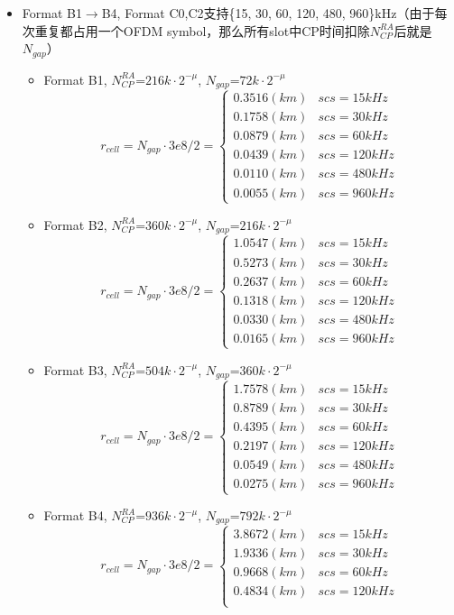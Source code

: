 \documentclass{article}
\begin{document}
\begin{itemize}
\item Format B1$\to$B4, Format C0,C2支持\{15, 30, 60, 120, 480, 960\}kHz（由于每次重复都占用一个OFDM symbol，那么所有slot中CP时间扣除$N_{CP}^{RA}$后就是$N_{gap}$）
\begin{itemize}
\item Format B1, $N_{CP}^{RA}$=$216k\cdot 2^{-\mu}$, $N_{gap}$=$72k\cdot 2^{-\mu}$
\[
r_{cell} = N_{gap}\cdot 3e8/2=\begin{cases}
0.3516(km) & scs=15kHz \\
0.1758(km) & scs=30kHz \\
0.0879(km) & scs=60kHz \\
0.0439(km) & scs=120kHz \\
0.0110(km) & scs=480kHz \\
0.0055(km) & scs=960kHz
\end{cases}
\]
\item Format B2, $N_{CP}^{RA}$=$360k\cdot 2^{-\mu}$, $N_{gap}$=$216k\cdot 2^{-\mu}$
\[
r_{cell} = N_{gap}\cdot 3e8/2=\begin{cases}
1.0547(km) & scs=15kHz \\
0.5273(km) & scs=30kHz \\
0.2637(km) & scs=60kHz \\
0.1318(km) & scs=120kHz \\
0.0330(km) & scs=480kHz \\
0.0165(km) & scs=960kHz
\end{cases}
\]
\item Format B3, $N_{CP}^{RA}$=$504k\cdot 2^{-\mu}$, $N_{gap}$=$360k\cdot 2^{-\mu}$
\[
r_{cell} = N_{gap}\cdot 3e8/2=\begin{cases}
1.7578(km) & scs=15kHz \\
0.8789(km) & scs=30kHz \\
0.4395(km) & scs=60kHz \\
0.2197(km) & scs=120kHz \\
0.0549(km) & scs=480kHz \\
0.0275(km) & scs=960kHz
\end{cases}
\]
\item Format B4, $N_{CP}^{RA}$=$936k\cdot 2^{-\mu}$, $N_{gap}$=$792k\cdot 2^{-\mu}$
\[
r_{cell} = N_{gap}\cdot 3e8/2=\begin{cases}
3.8672(km) & scs=15kHz \\
1.9336(km) & scs=30kHz \\
0.9668(km) & scs=60kHz \\
0.4834(km) & scs=120kHz \\

\end{cases}\]
\end{itemize}
\end{itemize}
\end{document}

